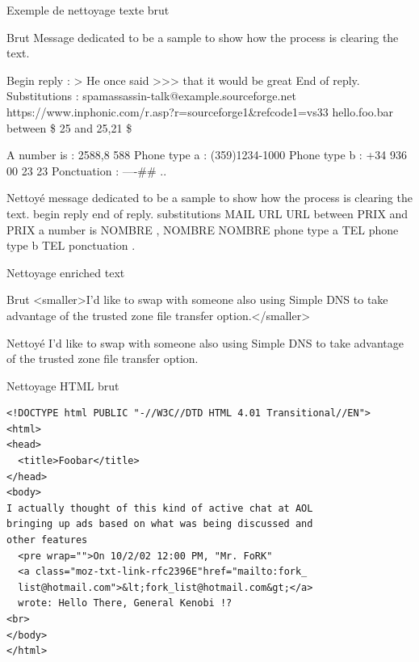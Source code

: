 \documentclass[xelatex,11pt, xcolor=dvipsnames]{beamer}
\begin{document}
\begin{frame}{Exemple de nettoyage texte brut}
	\begin{block}{Brut}
Message dedicated to be a sample to show how the process is clearing the text.

Begin reply :
> He once said
>>> that it would be great
End of reply.
Substitutions :
spamassassin-talk@example.sourceforge.net
https://www.inphonic.com/r.asp?r=sourceforge1\&refcode1=vs33
hello.foo.bar
between \$ 25 and 25,21 \$

A number is : 2588,8 588
Phone type a : (359)1234-1000
Phone type b : +34 936 00 23 23
Ponctuation : ----\#\# ..
	\end{block}
		
	\begin{block}{Nettoyé}
message dedicated to be a sample to show how the process is clearing the text. begin reply end of reply. substitutions MAIL URL URL between PRIX and PRIX a number is NOMBRE , NOMBRE NOMBRE phone type a TEL phone type b TEL ponctuation . 
	\end{block}

\end{frame}

\begin{frame}{Nettoyage enriched text}

	\begin{block}{Brut}
	<smaller>I'd like to swap with someone also using Simple DNS to take
advantage of the trusted zone file transfer option.</smaller>
	\end{block}
	
	\begin{block}{Nettoyé}
	I'd like to swap with someone also using Simple DNS to take
advantage of the trusted zone file transfer option.
	\end{block}
	
\end{frame}

\begin{frame}[fragile]{Nettoyage HTML brut}
\small
\begin{verbatim}
<!DOCTYPE html PUBLIC "-//W3C//DTD HTML 4.01 Transitional//EN">
<html>
<head>
  <title>Foobar</title>
</head>
<body>
I actually thought of this kind of active chat at AOL 
bringing up ads based on what was being discussed and 
other features
  <pre wrap="">On 10/2/02 12:00 PM, "Mr. FoRK" 
  <a class="moz-txt-link-rfc2396E"href="mailto:fork_
  list@hotmail.com">&lt;fork_list@hotmail.com&gt;</a> 
  wrote: Hello There, General Kenobi !?
<br>
</body>
</html>
\end{verbatim}
\normalsize
	
\end{frame}
\end{document}
